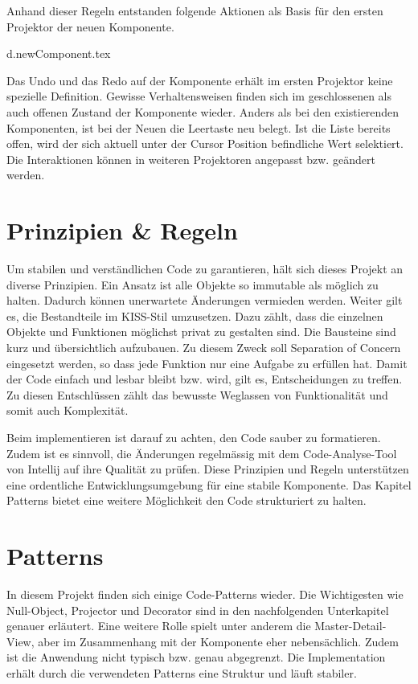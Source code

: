 \noindent
Anhand dieser Regeln entstanden folgende Aktionen als Basis für den ersten Projektor der neuen Komponente. 


\clearpage
{d.newComponent.tex}

Das Undo und das Redo auf der Komponente erhält im ersten Projektor keine spezielle Definition.
Gewisse Verhaltensweisen finden sich im geschlossenen als auch offenen Zustand der Komponente wieder.
Anders als bei den existierenden Komponenten, ist bei der Neuen die Leertaste neu belegt. 
Ist die Liste bereits offen, wird der sich aktuell unter der Cursor Position befindliche Wert selektiert.
Die Interaktionen können in weiteren Projektoren angepasst bzw. geändert werden.


\section{Prinzipien \& Regeln}

Um stabilen und verständlichen Code zu garantieren, hält sich dieses Projekt an diverse Prinzipien.
Ein Ansatz ist alle Objekte so immutable als möglich zu halten.
Dadurch können unerwartete Änderungen vermieden werden.
Weiter gilt es, die Bestandteile im KISS-Stil umzusetzen.
Dazu zählt, dass die einzelnen Objekte und Funktionen möglichst privat zu gestalten sind.
Die Bausteine sind kurz und übersichtlich aufzubauen.
Zu diesem Zweck soll Separation of Concern eingesetzt werden, so dass jede Funktion nur eine Aufgabe zu erfüllen hat.
Damit der Code einfach und lesbar bleibt bzw. wird, gilt es, Entscheidungen zu treffen.
Zu diesen Entschlüssen zählt das bewusste Weglassen von Funktionalität und somit auch Komplexität.

Beim implementieren ist darauf zu achten, den Code sauber zu formatieren.
Zudem ist es sinnvoll, die Änderungen regelmässig mit dem Code-Analyse-Tool von Intellij auf ihre Qualität zu prüfen. 
Diese Prinzipien und Regeln unterstützen eine ordentliche Entwicklungsumgebung für eine stabile Komponente.
Das Kapitel Patterns bietet eine weitere Möglichkeit den Code strukturiert zu halten.


\section{Patterns}

In diesem Projekt finden sich einige Code-Patterns wieder.
Die Wichtigesten wie Null-Object, Projector und Decorator sind in den nachfolgenden Unterkapitel genauer erläutert.
Eine weitere Rolle spielt unter anderem die Master-Detail-View, aber im Zusammenhang mit der Komponente eher nebensächlich.
Zudem ist die Anwendung nicht typisch bzw. genau abgegrenzt.
Die Implementation erhält durch die verwendeten Patterns eine Struktur und läuft stabiler.


